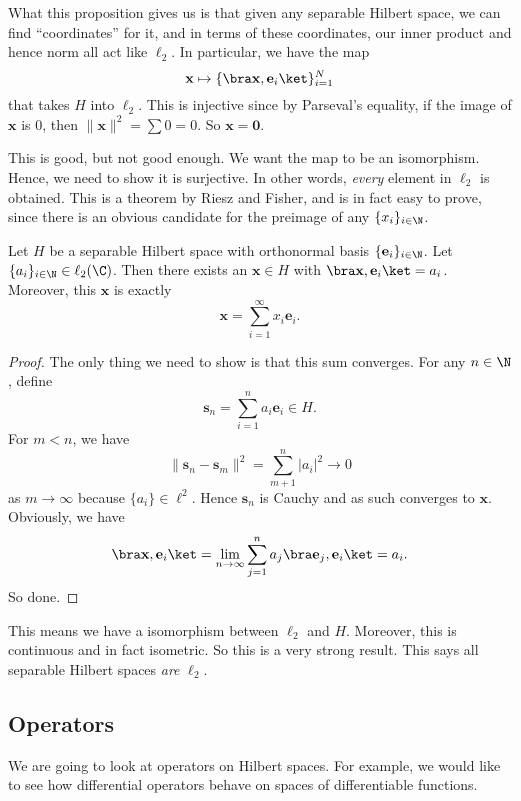 \documentclass[a4paper]{article}
\begin{document}
What this proposition gives us is that given any separable Hilbert space, we can find ``coordinates'' for it, and in terms of these coordinates, our inner product and hence norm all act like $\ell_2$. In particular, we have the map
\[
  \mathbf{x} \mapsto \{\bra \mathbf{x}, \mathbf{e}_i\ket \}_{i = 1}^N
\]
that takes $H$ into $\ell_2$. This is injective since by Parseval's equality, if the image of $\mathbf{x}$ is $0$, then $\|\mathbf{x}\|^2 = \sum 0 = 0$. So $\mathbf{x} = \mathbf{0}$.

This is good, but not good enough. We want the map to be an isomorphism. Hence, we need to show it is surjective. In other words, \emph{every} element in $\ell_2$ is obtained. This is a theorem by Riesz and Fisher, and is in fact easy to prove, since there is an obvious candidate for the preimage of any $\{x_i\}_{i \in \N}$.

\begin{prop}
  Let $H$ be a separable Hilbert space with orthonormal basis $\{\mathbf{e}_i\}_{i \in \N}$. Let $\{a_i\}_{i \in \N} \in \ell_2(\C)$. Then there exists an $\mathbf{x} \in H$ with $\bra \mathbf{x}, \mathbf{e}_i \ket = a_i$. Moreover, this $\mathbf{x}$ is exactly
  \[
    \mathbf{x} = \sum_{i = 1}^\infty x_i \mathbf{e}_i.
  \]
\end{prop}

\begin{proof}
  The only thing we need to show is that this sum converges. For any $n \in \N$, define
  \[
    \mathbf{s}_n = \sum_{i = 1}^n a_i \mathbf{e}_i \in H.
  \]
  For $m < n$, we have
  \[
    \|\mathbf{s}_n - \mathbf{s}_m\|^2 = \sum_{m + 1}^n |a_i|^2 \to 0
  \]
  as $m \to \infty$ because $\{a_i\} \in \ell^2$. Hence $\mathbf{s}_n$ is Cauchy and as such converges to $\mathbf{x}$. Obviously, we have
  \[
    \bra \mathbf{x}, \mathbf{e}_i\ket = \lim_{n \to \infty} \sum_{j = 1}^n a_j \bra \mathbf{e}_j, \mathbf{e}_i \ket = a_i.
  \]
  So done.
\end{proof}
This means we have a isomorphism between $\ell_2$ and $H$. Moreover, this is continuous and in fact isometric. So this is a very strong result. This says all separable Hilbert spaces \emph{are} $\ell_2$.
\subsection{Operators}
We are going to look at operators on Hilbert spaces. For example, we would like to see how differential operators behave on spaces of differentiable functions.
\end{document}
